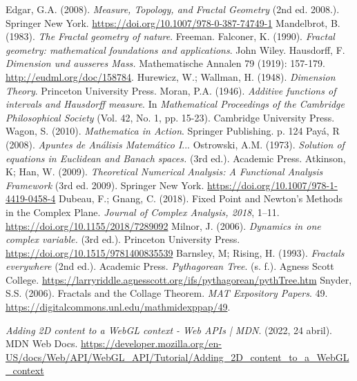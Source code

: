 \begin{thebibliography}{99}
    
 Edgar, G.A. (2008). \textit{Measure, Topology, and Fractal Geometry} (2nd ed. 2008.). Springer New York. \url{https://doi.org/10.1007/978-0-387-74749-1}
 Mandelbrot, B. (1983). \textit{The Fractal geometry of nature}. Freeman.
 Falconer, K. (1990). \textit{Fractal geometry: mathematical foundations and applications}. John Wiley.
 Hausdorff, F. \textit{Dimension und ausseres Mass.} Mathematische Annalen 79 (1919): 157-179. \url{http://eudml.org/doc/158784}.
Hurewicz, W.; Wallman, H. (1948). \textit{Dimension Theory}. Princeton University Press.
Moran, P.A. (1946). \textit{Additive functions of intervals and Hausdorff measure}. In \textit{Mathematical Proceedings of the Cambridge Philosophical Society} (Vol. 42, No. 1, pp. 15-23). Cambridge University Press.
Wagon, S. (2010). \textit{Mathematica in Action}. Springer Publishing. p. 124
 Payá, R (2008). \textit{Apuntes de Análisis Matemático I}...
 Ostrowski, A.M. (1973). \textit{Solution of equations in Euclidean and Banach spaces.} (3rd ed.). Academic Press.
 Atkinson, K; Han, W. (2009). \textit{Theoretical Numerical Analysis: A Functional Analysis Framework} (3rd ed. 2009). Springer New York. \url{https://doi.org/10.1007/978-1-4419-0458-4}
 Dubeau, F.; Gnang, C. (2018). Fixed Point and Newton’s Methods in the Complex Plane. \textit{Journal of Complex Analysis, 2018}, 1–11. \url{https://doi.org/10.1155/2018/7289092}
 Milnor, J. (2006). \textit{Dynamics in one complex variable.} (3rd ed.). Princeton University Press. \url{https://doi.org/10.1515/9781400835539}
 Barnsley, M; Rising, H. (1993). \textit{Fractals everywhere} (2nd ed.). Academic Press.
 \textit{Pythagorean Tree}. (s. f.). Agness Scott College. \url{https://larryriddle.agnesscott.org/ifs/pythagorean/pythTree.htm}
 Snyder, S.S. (2006). Fractals and the Collage Theorem. \textit{MAT Expository Papers}. 49. \url{https://digitalcommons.unl.edu/mathmidexppap/49}.

 \textit{Adding 2D content to a WebGL context - Web APIs | MDN}. (2022, 24 abril). MDN Web Docs. \url{https://developer.mozilla.org/en-US/docs/Web/API/WebGL_API/Tutorial/Adding_2D_content_to_a_WebGL_context}


\end{thebibliography}
